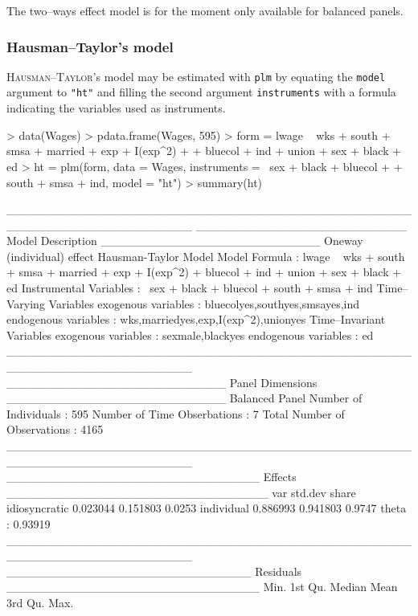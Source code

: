 \documentclass{article}
\begin{document}
The two--ways effect model is for the moment only available for
balanced panels.


\subsubsection{Hausman--Taylor's model}

\textsc{Hausman}--\textsc{Taylor}'s model may be estimated with \texttt{plm}
by equating the \texttt{model} argument to  \texttt{"ht"} and
filling the second argument \texttt{instruments} with a formula
indicating the variables used as instruments.


\begin{Schunk}
\begin{Sinput}
> data(Wages)
> pdata.frame(Wages, 595)
> form = lwage ~ wks + south + smsa + married + exp + I(exp^2) + 
+     bluecol + ind + union + sex + black + ed
> ht = plm(form, data = Wages, instruments = ~sex + black + bluecol + 
+     south + smsa + ind, model = "ht")
> summary(ht)
\end{Sinput}
\begin{Soutput}
______________________________________________________________________ 
_________________________ Model Description __________________________
Oneway (individual) effect
Hausman-Taylor Model
Model Formula            : lwage ~ wks + south + smsa + married + 
                               exp + I(exp^2) + bluecol + ind + 
                               union + sex + black + ed
Instrumental Variables   : ~sex + black + bluecol + south + smsa + 
                               ind
Time--Varying Variables    
    exogenous variables   :  bluecolyes,southyes,smsayes,ind 
    endogenous variables  :  wks,marriedyes,exp,I(exp^2),unionyes 
Time--Invariant Variables  
    exogenous variables   :  sexmale,blackyes 
    endogenous variables  :  ed 
______________________________________________________________________ 
__________________________ Panel Dimensions __________________________
Balanced Panel
Number of Individuals        :  595
Number of Time Obserbations  :  7
Total Number of Observations :  4165
______________________________________________________________________ 
______________________________ Effects _______________________________
                   var  std.dev  share
idiosyncratic 0.023044 0.151803 0.0253
individual    0.886993 0.941803 0.9747
theta   :  0.93919  
______________________________________________________________________ 
_____________________________ Residuals ______________________________
     Min.   1st Qu.    Median      Mean   3rd Qu.      Max. 

\end{Soutput}
\end{Schunk}
\end{document}
